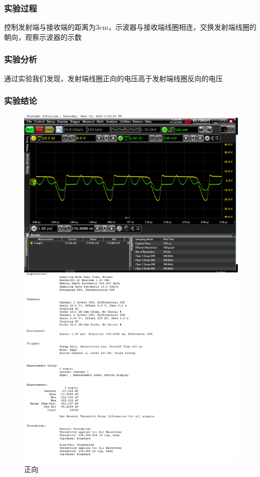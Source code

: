 \documentclass[conference]{IEEEtran}
\theoremstyle{break}
\begin{document}
\subsubsection{实验过程}
控制发射端与接收端的距离为3cm，示波器与接收端线圈相连，交换发射端线圈的朝向，观察示波器的示数
\subsubsection{实验分析}
通过实验我们发现，发射端线圈正向的电压高于发射端线圈反向的电压
\subsubsection{实验结论}
\begin{figure}[htbp]
        \centerline{\includegraphics[scale=0.1]{电压结论1.png}}
        \caption{正向}
        \label{fig}
        \end{figure}
\end{document}
